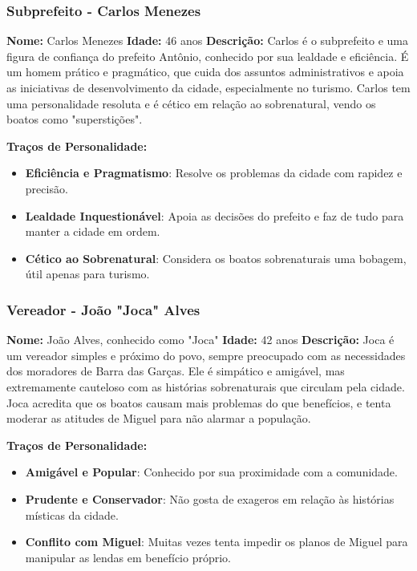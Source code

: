 \begin{personagem}  

\subsubsection{Subprefeito - Carlos Menezes}

\textbf{Nome:} Carlos Menezes  
\textbf{Idade:} 46 anos  
\textbf{Descrição:}  
Carlos é o subprefeito e uma figura de confiança do prefeito Antônio, conhecido por sua lealdade e eficiência. É um homem prático e pragmático, que cuida dos assuntos administrativos e apoia as iniciativas de desenvolvimento da cidade, especialmente no turismo. Carlos tem uma personalidade resoluta e é cético em relação ao sobrenatural, vendo os boatos como "superstições".

\textbf{Traços de Personalidade:}
\begin{itemize}
    \item \textbf{Eficiência e Pragmatismo}: Resolve os problemas da cidade com rapidez e precisão.
    \item \textbf{Lealdade Inquestionável}: Apoia as decisões do prefeito e faz de tudo para manter a cidade em ordem.
    \item \textbf{Cético ao Sobrenatural}: Considera os boatos sobrenaturais uma bobagem, útil apenas para turismo.
\end{itemize}
\end{personagem}
\begin{personagem}  
 
\subsubsection{Vereador - João "Joca" Alves}

\textbf{Nome:} João Alves, conhecido como "Joca"  
\textbf{Idade:} 42 anos  
\textbf{Descrição:}  
Joca é um vereador simples e próximo do povo, sempre preocupado com as necessidades dos moradores de Barra das Garças. Ele é simpático e amigável, mas extremamente cauteloso com as histórias sobrenaturais que circulam pela cidade. Joca acredita que os boatos causam mais problemas do que benefícios, e tenta moderar as atitudes de Miguel para não alarmar a população.

\textbf{Traços de Personalidade:}
\begin{itemize}
    \item \textbf{Amigável e Popular}: Conhecido por sua proximidade com a comunidade.
    \item \textbf{Prudente e Conservador}: Não gosta de exageros em relação às histórias místicas da cidade.
    \item \textbf{Conflito com Miguel}: Muitas vezes tenta impedir os planos de Miguel para manipular as lendas em benefício próprio.
\end{itemize}
\end{personagem}
